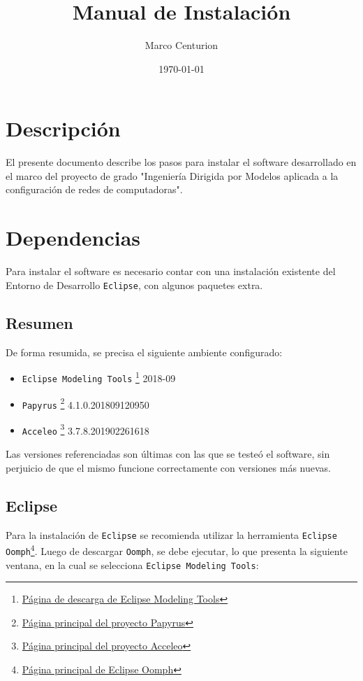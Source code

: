 \documentclass[11pt]{article}
\author{Marco Centurion}
\date{\today}
\title{Manual de Instalación}
\begin{document}
\maketitle
\tableofcontents

\section{Descripción}
\label{sec:org5c161cf}
El presente documento describe los pasos para instalar el software
desarrollado en el marco del proyecto de grado "Ingeniería Dirigida
por Modelos aplicada a la configuración de redes de computadoras".
\section{Dependencias}
\label{sec:org4b39ff3}
Para instalar el software es necesario contar con una instalación
existente del Entorno de Desarrollo \texttt{Eclipse}, con algunos paquetes
extra.
\subsection{Resumen}
\label{sec:org2f21645}

De forma resumida, se precisa el siguiente ambiente configurado:

\begin{itemize}
\item \texttt{Eclipse Modeling Tools} \footnote{\href{https://www.eclipse.org/downloads/packages/release/2008-09/r/eclipse-modeling-tools}{Página de descarga de Eclipse Modeling Tools}} 2018-09
\item \texttt{Papyrus} \footnote{\href{https://www.eclipse.org/papyrus/}{Página principal del proyecto Papyrus}} 4.1.0.201809120950
\item \texttt{Acceleo} \footnote{\href{https://www.eclipse.org/acceleo/}{Página principal del proyecto Acceleo}} 3.7.8.201902261618
\end{itemize}

Las versiones referenciadas son últimas con las que se testeó el
software, sin perjuicio de que el mismo funcione correctamente con
versiones más nuevas.
\subsection{Eclipse}
\label{sec:org721ce9f}

Para la instalación de \texttt{Eclipse} se recomienda utilizar la herramienta
\texttt{Eclipse Oomph}\footnote{\href{https://projects.eclipse.org/projects/tools.oomph}{Página principal de Eclipse Oomph}}. Luego de descargar \texttt{Oomph}, se debe ejecutar,
lo que presenta la siguiente ventana, en la cual se selecciona
\texttt{Eclipse Modeling Tools}:
\end{document}
